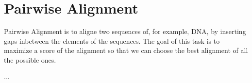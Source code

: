 \section{Pairwise Alignment}
Pairwise Alignment is to aligne two sequences of, for example, DNA, by inserting gaps inbetween the elements of the sequences.  The goal of this task is to maximize a score of the alignment so that we can choose the best alignment of all the possible ones.

...
